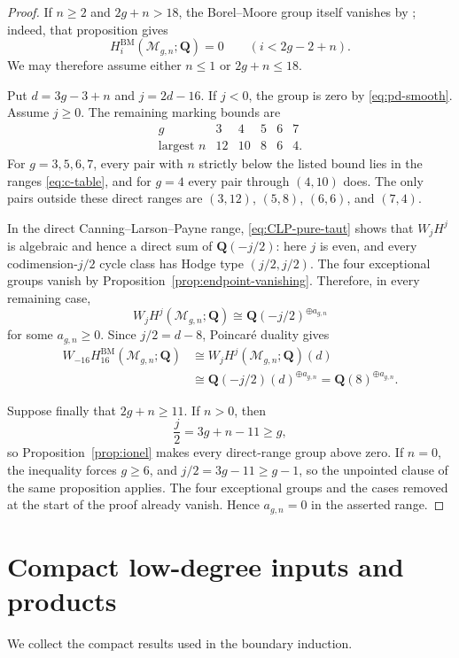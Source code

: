 \documentclass[12pt,reqno]{amsart}
\newcommand{\Q}{\mathbf{Q}}
\newcommand{\M}{\mathcal{M}}
\newcommand{\BM}{\mathrm{BM}}
\theoremstyle{definition}
\theoremstyle{remark}
\begin{document}
\begin{proof}
If $n\geq2$ and $2g+n>18$, the Borel--Moore group itself vanishes by
\cite[Proposition~2.1]{BFP}; indeed, that proposition gives
\[
 H_i^{\BM}(\M_{g,n};\Q)=0\qquad(i<2g-2+n).
\]
We may therefore assume either $n\leq1$ or $2g+n\leq18$.

Put $d=3g-3+n$ and $j=2d-16$.  If $j<0$, the group is zero by
\eqref{eq:pd-smooth}.  Assume $j\geq0$.  The remaining marking bounds are
\[
\begin{array}{c|ccccc}
g&3&4&5&6&7\\ \hline
\text{largest }n&12&10&8&6&4.
\end{array}
\]
For $g=3,5,6,7$, every pair with $n$ strictly below the listed bound lies
in the ranges \eqref{eq:c-table}, and for $g=4$ every pair through
$(4,10)$ does.  The only pairs outside these direct ranges are
$(3,12)$, $(5,8)$, $(6,6)$, and $(7,4)$.

In the direct Canning--Larson--Payne range,
\eqref{eq:CLP-pure-taut} shows that $W_jH^j$ is algebraic and hence a direct
sum of $\Q(-j/2)$: here $j$ is even, and every codimension-$j/2$ cycle class
has Hodge type $(j/2,j/2)$.  The four exceptional groups vanish by
Proposition~\ref{prop:endpoint-vanishing}.  Therefore, in every remaining
case,
\[
 W_jH^j(\M_{g,n};\Q)
 \cong\Q(-j/2)^{\oplus a_{g,n}}
\]
for some $a_{g,n}\geq0$.  Since $j/2=d-8$, Poincar\'e duality gives
\begin{align*}
 W_{-16}H_{16}^{\BM}(\M_{g,n};\Q)
 &\cong W_jH^j(\M_{g,n};\Q)(d)\\
 &\cong\Q(-j/2)(d)^{\oplus a_{g,n}}
  =\Q(8)^{\oplus a_{g,n}}.
\end{align*}

Suppose finally that $2g+n\geq11$.  If $n>0$, then
\[
 \frac j2=3g+n-11\geq g,
\]
so Proposition~\ref{prop:ionel} makes every direct-range group above zero.
If $n=0$, the inequality forces $g\geq6$, and
$j/2=3g-11\geq g-1$, so the unpointed clause of the same proposition
applies.  The four exceptional groups and the cases removed at the start
of the proof already vanish.  Hence $a_{g,n}=0$ in the asserted range.
\end{proof}

\section{Compact low-degree inputs and products}
\label{sec:compact-inputs}

We collect the compact results used in the boundary induction.
\end{document}
